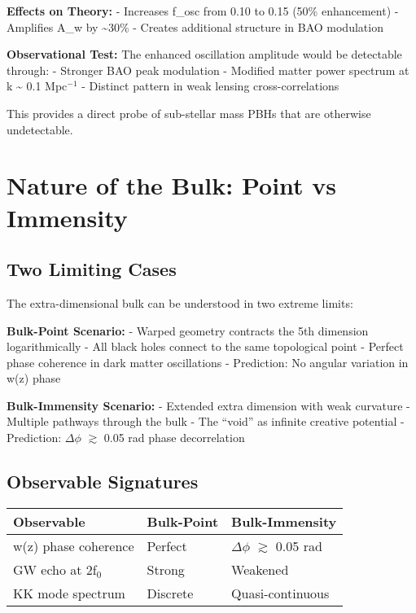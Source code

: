 \documentclass[
  11pt,
]{report}
\begin{document}
\textbf{Effects on Theory:} - Increases f\_osc from 0.10 to 0.15 (50\%
enhancement) - Amplifies A\_w by \textasciitilde30\% - Creates
additional structure in BAO modulation

\textbf{Observational Test:} The enhanced oscillation amplitude would be
detectable through: - Stronger BAO peak modulation - Modified matter
power spectrum at k \textasciitilde{} 0.1 Mpc\(^{-1}\) - Distinct
pattern in weak lensing cross-correlations

This provides a direct probe of sub-stellar mass PBHs that are otherwise
undetectable.

\section{Nature of the Bulk: Point vs
Immensity}\label{nature-of-the-bulk-point-vs-immensity}

\subsection{Two Limiting Cases}\label{two-limiting-cases}

The extra-dimensional bulk can be understood in two extreme limits:

\textbf{Bulk-Point Scenario:} - Warped geometry contracts the 5th
dimension logarithmically - All black holes connect to the same
topological point - Perfect phase coherence in dark matter oscillations
- Prediction: No angular variation in w(z) phase

\textbf{Bulk-Immensity Scenario:} - Extended extra dimension with weak
curvature - Multiple pathways through the bulk - The ``void'' as
infinite creative potential - Prediction: \(\Delta\phi\) \(\gtrsim\)
0.05 rad phase decorrelation

\subsection{Observable Signatures}\label{observable-signatures}

\begin{longtable}[]{@{}lll@{}}
\toprule\noalign{}
Observable & Bulk-Point & Bulk-Immensity \\
\midrule\noalign{}
\endhead
\bottomrule\noalign{}
\endlastfoot
w(z) phase coherence & Perfect & \(\Delta\phi\) \(\gtrsim\) 0.05 rad \\
GW echo at 2f\(_0\) & Strong & Weakened \\
KK mode spectrum & Discrete & Quasi-continuous \\
\end{longtable}
\end{document}
